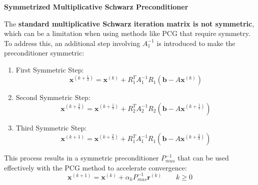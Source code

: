 \newpage

\begin{flushleft}
    \textcolor{Green3}{ \textbf{Symmetrized Multiplicative Schwarz Preconditioner}}
\end{flushleft}
The \textbf{standard multiplicative Schwarz iteration matrix is not symmetric}, which can be a limitation when using methods like PCG that require symmetry. To address this, an additional step involving $A_{1}^{-1}$ is introduced to make the preconditioner symmetric:
\begin{enumerate}
    \item First Symmetric Step:
    \begin{equation}
        \mathbf{x}^{\left(k+\frac{1}{3}\right)} = \mathbf{x}^{\left(k\right)} + R_{1}^{T}A_{1}^{-1}R_{1}\left(\mathbf{b}-A\mathbf{x}^{\left(k\right)}\right)
    \end{equation}

    \item Second Symmetric Step:
    \begin{equation}
        \mathbf{x}^{\left(k+\frac{2}{3}\right)} = \mathbf{x}^{\left(k+\frac{1}{3}\right)} + R_{2}^{T}A_{2}^{-1}R_{2}\left(\mathbf{b}-A\mathbf{x}^{\left(k+\frac{1}{3}\right)}\right)
    \end{equation}

    \item Third Symmetric Step:
    \begin{equation}
        \mathbf{x}^{\left(k+1\right)} = \mathbf{x}^{\left(k+\frac{2}{3}\right)} + R_{1}^{T}A_{1}^{-1}R_{1}\left(\mathbf{b}-A\mathbf{x}^{\left(k+\frac{2}{3}\right)}\right)
    \end{equation}
\end{enumerate}
This process results in a symmetric preconditioner $P_{mus}^{-1}$ that can be used effectively with the PCG method to accelerate convergence:
\begin{equation}
    \mathbf{x}^{\left(k+1\right)} = \mathbf{x}^{\left(k\right)} + \alpha_{k}P_{mus}^{-1}\mathbf{r}^{\left(k\right)} \hspace{2em} k \ge 0
\end{equation}